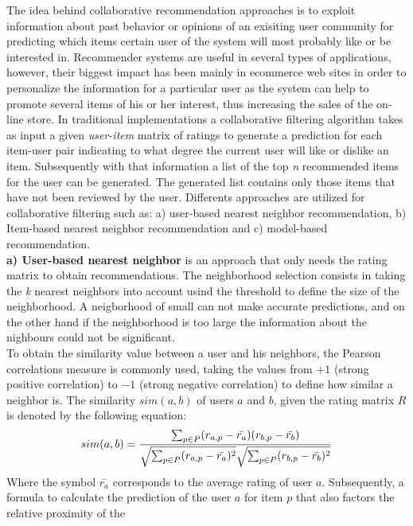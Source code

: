 The idea behind collaborative recommendation approaches is to exploit
information about past behavior or opinions of an exisiting user
community  for predicting which items certain user of the system will
most probably like or be interested in\cite{jannach2010recommender}. 
Recommender systems are useful in several types of  applications,
however, their biggest impact has been mainly in ecommerce  web sites
in order to personalize the information for a particular user as the
system can help to promote several items of his or her interest, thus
increasing the sales of the on-line store. In traditional
implementations a collaborative filtering algorithm takes as
input a given \textit{user-item} matrix of ratings to generate a
prediction for each item-user pair indicating to what degree the
current user will like or dislike an item. Subsequently with that
information a list of the top \textit{n} recommended items for the
user can be generated. The generated list contains only those items
that have not been reviewed by the user. Differents approaches are
utilized for collaborative filtering such as: a) user-based nearest 
neighbor recommendation, b) Item-based nearest neighbor 
recommendation and c) model-based recommendation.\\
\textbf{a) User-based nearest neighbor} is an approach that only 
needs the rating matrix to obtain recommendations. 
The neighborhood selection consists in taking
the \textit{k}  nearest neighbors into account usind the threshold to
define the size of the neighborhood. A neigborhood of small can not
make accurate predictions, and on the other hand if the neighborhood
is too large the information about the nighbours could not be
significant.\\ To obtain the similarity value between a user and his
neighbors, the Pearson correlations measure is commonly used, taking
the values from $+1$ (strong positive correlation) to $-1$ (strong
negative correlation) to define how similar a neighbor is. The
similarity $sim(a,b)$ of users $a$ and $b$, given the rating matrix
$R$ is denoted by the following equation:
\begin{equation}\label{eq:pearson1}
\displaystyle sim(a,b) = {\sum_{p \in P}(r_{a,p} - 
\bar{r_a})(r_{b,p}- \bar{r_b}) 
\over \sqrt{\sum_{p \in P}(r_{a,p} - \bar{r_a})^2} 
\sqrt{\sum_{p \in P} 
(r_{b,p}- \bar{r_b})^2}}
\end{equation}
Where the symbol $\bar{r_a}$ corresponds to the average rating of user
$a$. Subsequently, a formula to calculate the prediction of the user
$a$ for item $p$ that also factors the relative proximity of the
